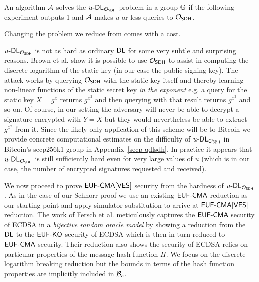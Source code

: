 \begin{definition}
  An algorithm $\mathcal{A}$ solves the $u\text{-}\textsf{DL}_{\mathcal{O}_{\textsf{SDH}}}$ problem in a group $\mathbb{G}$ if the following experiment outputs 1 and $\mathcal{A}$ makes $u$ or less queries to $\mathcal{O}_{\textsf{SDH}}$.
  \begin{center}
  \end{center}
\end{definition}

Changing the problem we reduce from comes with a cost.

$u\text{-}\textsf{DL}_{\mathcal{O}_{\textsf{SDH}}}$ is not as hard as ordinary $\textsf{DL}$ for some very subtle and surprising reasons.
Brown et al.\cite{SDHP} show it is possible to use $\mathcal{O}_{\textsf{SDH}}$ to assist in computing the discrete logarithm of the static key (in our case the public signing key).
The attack works by querying $\mathcal{O}_{\textsf{SDH}}$ with the static key itself and thereby learning non-linear functions of the static secret key \emph{in the exponent} e.g. a query for the static key $X = g^x$ returns $g^{x^2}$ and then querying with that result returns $g^{x^3}$ and so on.
Of course, in our setting the adversary will never be able to decrypt a signature encrypted with $Y = X$ but they would nevertheless be able to extract $g^{x^2}$ from it.
Since the likely only application of this scheme will be to Bitcoin we provide concrete computational estimates on the difficulty of $u\text{-}\textsf{DL}_{\mathcal{O}_{\textsf{SDH}}}$ in Bitcoin's secp256k1 group in Appendix~\ref{secp-qdlsdh}.
In practice it appears that $u\text{-}\textsf{DL}_{\mathcal{O}_{\textsf{SDH}}}$ is still sufficiently hard even for very large values of $u$ (which is in our case, the number of encrypted signatures requested and received).

We now proceed to prove $\textsf{EUF-CMA}[\textsf{VES}]$ security from the hardness of $u\text{-}\textsf{DL}_{\mathcal{O}_{\textsf{SDH}}}$.
As in the case of our Schnorr proof we use an existing $\textsf{EUF-CMA}$ reduction as our starting point and apply simulator substitution to arrive at $\textsf{EUF-CMA}[\textsf{VES}]$ reduction.
The work of Fersch et al.\cite{ecdsa-eufcma} meticulously captures the $\textsf{EUF-CMA}$ security of ECDSA in a \emph{bijective random oracle model} by showing a reduction from the $\textsf{DL}$ to the $\textsf{EUF-KO}$ security of ECDSA which is then in-turn reduced to $\textsf{EUF-CMA}$ security.
Their reduction also shows the security of ECDSA relies on particular properties of the message hash function $H$.
We focus on the discrete logarithm breaking reduction but the bounds in terms of the hash function properties are implicitly included in $\mathcal{B}_e$.

